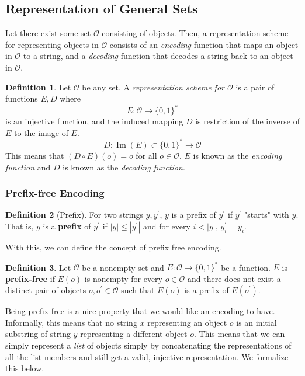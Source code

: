 \documentclass[a4paper, 12pt]{report}
\DeclareMathOperator{\im}{Im}
\theoremstyle{remark}
\theoremstyle{definition}
\newtheorem{definition}{Definition}[section]
\begin{document}
\subsection{Representation of General Sets}
Let there exist some set $\mathcal{O}$ consisting of objects. Then, a representation scheme for representing objects in $\mathcal{O}$ consists of an \textit{encoding} function that maps an object in $\mathcal{O}$ to a string, and a \textit{decoding} function that decodes a string back to an object in $\mathcal{O}$. 

\begin{definition}
Let $\mathcal{O}$ be any set. A \textit{representation scheme for $\mathcal{O}$} is a pair of functions $E, D$ where 
\[E: \mathcal{O} \longrightarrow \{0,1\}^*\]
is an injective function, and the induced mapping $D$ is restriction of the inverse of $E$ to the image of $E$. 
\[D: \im(E) \subset \{0,1\}^* \longrightarrow \mathcal{O}\]
This means that $(D \circ E) (o) = o$ for all $o \in \mathcal{O}$. $E$ is known as the \textit{encoding function} and $D$ is known as the \textit{decoding function}. 
\end{definition}

\subsubsection{Prefix-free Encoding}
\begin{definition}[Prefix]
For two strings $y, y^\prime$, $y$ is a prefix of $y^\prime$ if $y^\prime$ "starts" with $y$. That is, $y$ is a \textbf{prefix} of $y^\prime$ if $|y| \leq |y^\prime|$ and for every $i<|y|$, $y_i^\prime = y_i$. 
\end{definition}

With this, we can define the concept of prefix free encoding. 

\begin{definition}
Let $\mathcal{O}$ be a nonempty set and $E: \mathcal{O} \longrightarrow \{0,1\}^*$ be a function. $E$ is \textbf{prefix-free} if $E(o)$ is nonempty for every $o \in \mathcal{O}$ and there does not exist a distinct pair of objects $o, o^\prime \in \mathcal{O}$ such that $E(o)$ is a prefix of $E(o^\prime)$. 
\end{definition}

Being prefix-free is a nice property that we would like an encoding to have. Informally, this means that no string $x$ representing an object $o$ is an initial substring of string $y$ representing a different object $o$. This means that we can simply represent a \textit{list} of objects simply by concatenating the representations of all the list members and still get a valid, injective representation. We formalize this below.
\end{document}
